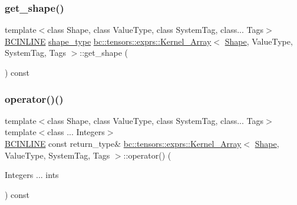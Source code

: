\mbox{\label{structbc_1_1tensors_1_1exprs_1_1Kernel__Array_ade157280b1466add51cecfeca946549a}} 
\subsubsection{\texorpdfstring{get\+\_\+shape()}{get\_shape()}}
{\footnotesize\ttfamily template$<$class Shape, class Value\+Type, class System\+Tag, class... Tags$>$ \\
\hyperlink{common_8h_a6699e8b0449da5c0fafb878e59c1d4b1}{B\+C\+I\+N\+L\+I\+NE} \hyperlink{structbc_1_1tensors_1_1exprs_1_1Kernel__Array_ae6a4db456a47818cda06bb76d05a3b6e}{shape\+\_\+type} \hyperlink{structbc_1_1tensors_1_1exprs_1_1Kernel__Array}{bc\+::tensors\+::exprs\+::\+Kernel\+\_\+\+Array}$<$ \hyperlink{structbc_1_1Shape}{Shape}, Value\+Type, System\+Tag, Tags $>$\+::get\+\_\+shape (\begin{DoxyParamCaption}{ }\end{DoxyParamCaption}) const\hspace{0.3cm}{\ttfamily [inline]}}

\mbox{\label{structbc_1_1tensors_1_1exprs_1_1Kernel__Array_aaa2ea8d4e5aea0c8969833c2dc2ed0fb}} 
\subsubsection{\texorpdfstring{operator()()}{operator()()}\hspace{0.1cm}{\footnotesize\ttfamily [1/2]}}
{\footnotesize\ttfamily template$<$class Shape, class Value\+Type, class System\+Tag, class... Tags$>$ \\
template$<$class ... Integers$>$ \\
\hyperlink{common_8h_a6699e8b0449da5c0fafb878e59c1d4b1}{B\+C\+I\+N\+L\+I\+NE} const return\+\_\+type\& \hyperlink{structbc_1_1tensors_1_1exprs_1_1Kernel__Array}{bc\+::tensors\+::exprs\+::\+Kernel\+\_\+\+Array}$<$ \hyperlink{structbc_1_1Shape}{Shape}, Value\+Type, System\+Tag, Tags $>$\+::operator() (\begin{DoxyParamCaption}\item[{Integers ...}]{ints }\end{DoxyParamCaption}) const\hspace{0.3cm}{\ttfamily [inline]}}

